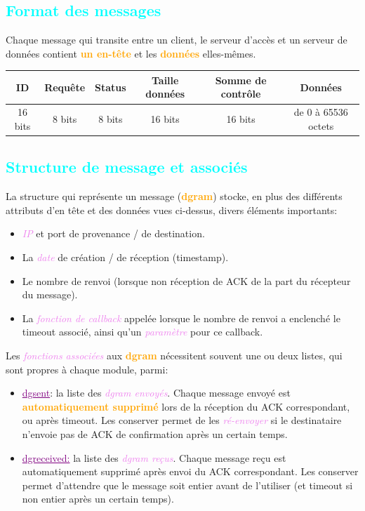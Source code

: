 \documentclass[a4paper]{article}
\let\oldsubsection\subsection{}
\renewcommand{\subsection}[1]{\textcolor{cyan}{\oldsubsection{#1}}}
\let\oldtextbf\textbf
\renewcommand{\textbf}[1]{\textcolor{orange}{\oldtextbf{#1}}}
\let\oldunderline\underline{}
\renewcommand{\underline}[1]{\textcolor{purple}{\oldunderline{#1}}}
\let\oldtextit\textit
\renewcommand{\textit}[1]{\textcolor{violet}{\oldtextit{#1}}}
\begin{document}
\subsection{Format des messages}

Chaque message qui transite entre un client, le serveur d'accès et un serveur de données contient \textbf{un en-tête} et les \textbf{données} elles-mêmes.

\begin{tabular}{|c|c|c|c|c|c|}
    \hline
    ID & Requête & Status & Taille données & Somme de contrôle & Données\\
    \hline
    16 bits & 8 bits & 8 bits & 16 bits & 16 bits & de 0 à 65536 octets\\
    \hline
\end{tabular}

\subsection{Structure de message et associés}

La structure qui représente un message (\textbf{dgram}) stocke, en plus des différents attributs d'en tête et des données vues ci-dessus, divers éléments importants:
\begin{itemize}
    \item \textit{IP} et port de provenance / de destination.
    \item La \textit{date} de création / de réception (timestamp).
    \item Le nombre de renvoi (lorsque non réception de ACK de la part du récepteur du message).
    \item La \textit{fonction de callback} appelée lorsque le nombre de renvoi a enclenché le timeout associé, ainsi qu'un \textit{paramètre} pour ce callback.
\end{itemize}

Les \textit{fonctions associées} aux \textbf{dgram} nécessitent souvent une ou deux listes, qui sont propres à chaque module, parmi:
\begin{itemize}
    \item \underline{dgsent}: la liste des \textit{dgram envoyés}. Chaque message envoyé est \textbf{automatiquement supprimé} lors de la réception du ACK correspondant, ou après timeout. Les conserver permet de les \textit{ré-envoyer} si le destinataire n'envoie pas de ACK de confirmation après un certain temps.
    \item \underline{dgreceived:} la liste des \textit{dgram reçus}. Chaque message reçu est automatiquement supprimé après envoi du ACK correspondant. Les conserver permet d'attendre que le message soit entier avant de l'utiliser (et timeout si non entier après un certain temps).
\end{itemize}
\end{document}
